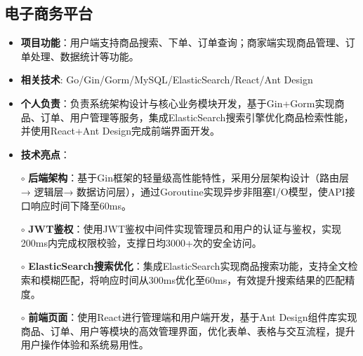 \subsection{\textbf{电子商务平台} \hspace{2cm}{2024.10 -- 2024.12}}
  \begin{normalsize}
    \begin{itemize}
    \item \textbf{项目功能}：用户端支持商品搜索、下单、订单查询；商家端实现商品管理、订单处理、数据统计等功能。
    \item \textbf{相关技术}: Go/Gin/Gorm/MySQL/ElasticSearch/React/Ant Design
    \item \textbf{个人负责}：负责系统架构设计与核心业务模块开发，基于Gin+Gorm实现商品、订单、用户管理等服务，集成ElasticSearch搜索引擎优化商品检索性能，并使用React+Ant Design完成前端界面开发。
    \item \textbf{技术亮点}：
    \setlength{\itemindent}{1em} %
      \item[$\circ$] \textbf{后端架构}：基于Gin框架的轻量级高性能特性，采用分层架构设计（路由层→ 逻辑层→ 数据访问层），通过Goroutine实现异步非阻塞I/O模型，使API接口响应时间下降至60ms。
        \item[$\circ$] \textbf{JWT鉴权}：使用JWT鉴权中间件实现管理员和用户的认证与鉴权，实现200ms内完成权限校验，支撑日均3000+次的安全访问。
        \item[$\circ$] \textbf{ElasticSearch搜索优化}：集成ElasticSearch实现商品搜索功能，支持全文检索和模糊匹配，将响应时间从300ms优化至60ms，有效提升搜索结果的匹配精度。
        \item[$\circ$] \textbf{前端页面}：使用React进行管理端和用户端开发，基于Ant Design组件库实现商品、订单、用户等模块的高效管理界面，优化表单、表格与交互流程，提升用户操作体验和系统易用性。
    \end{itemize}
  \end{normalsize}